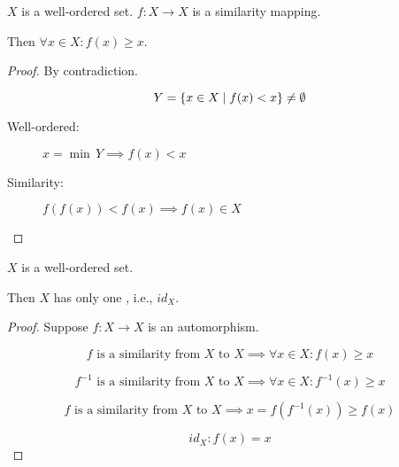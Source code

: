 \begin{frame}{}
  \begin{lemma}
    $X$ is a well-ordered set. $f: X \to X$ is a similarity mapping.

    Then $\forall x \in X: f(x) \ge x$.
  \end{lemma}

  \vspace{0.50cm}
  \begin{proof}
    \pause
    \centerline{By contradiction.}

    \pause
    \[
      Y = \{x \in X \mid f(x) < x\} \neq \emptyset
    \]

    \pause
    \vspace{0.20cm}
    \begin{description}
      \item[Well-ordered:] $x = \min\, Y \implies f(x) < x$ 
      \pause
      \item[Similarity:] $f(f(x)) < f(x) \implies f(x) \in X$
    \end{description}
  \end{proof}
\end{frame}

\begin{frame}{}
  \begin{lemma}
    $X$ is a well-ordered set. 

    Then $X$ has only one , i.e., $id_X$.
  \end{lemma}

  \vspace{0.50cm}
  \begin{proof}
    \pause
    \centerline{Suppose $f: X \to X$ is an automorphism.}

    \pause
    \[
      f \text{ is a similarity from $X$ to $X$} \implies \forall x \in X: f(x) \ge x
    \]

    \pause
    \[
      f^{-1} \text{ is a similarity from $X$ to $X$} \implies \forall x \in X: f^{-1}(x) \ge x
    \]

    \pause
    \[
      f \text{ is a similarity from $X$ to $X$} \implies x = f(f^{-1}(x)) \ge f(x)
    \]

    \pause
    \[
      id_X: f(x) = x
    \]
  \end{proof}
\end{frame}


